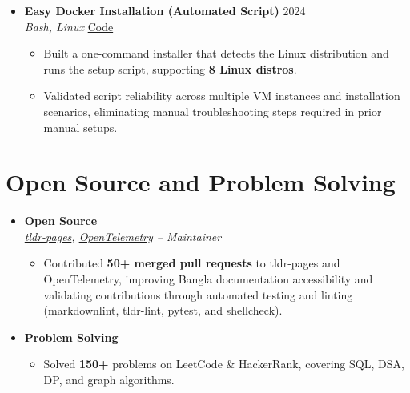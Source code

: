 \documentclass[a4paper]{article}
\newcommand{\resumeItem}[1]{
  \item\small{
    {#1 \vspace{-2pt}}
  }
}
\newcommand{\resumeItemListStart}{\begin{itemize}}
\newcommand{\resumeItemListEnd}{\end{itemize}\vspace{-5pt}}
\begin{document}
\begin{itemize}[leftmargin=0.15in, label={}, itemsep=3pt]
    \item
    \textbf{Easy Docker Installation (Automated Script)} \hfill 2024\\
    \small\textit{Bash, Linux} \hfill
    \href{https://github.com/badhon495/Easy_Docker_Installation}{Code}
    \vspace{-5pt}
    \resumeItemListStart
      \resumeItem{Built a one-command installer that detects the Linux distribution and runs the setup script, supporting \textbf{8 Linux distros}.}
      \resumeItem{Validated script reliability across multiple VM instances and installation scenarios, eliminating manual troubleshooting steps required in prior manual setups.}
    \resumeItemListEnd
    
  \end{itemize}




\section{Open Source and Problem Solving}
  \begin{itemize}[leftmargin=0.15in, label={}, itemsep=6pt]

    \item
    \textbf{Open Source} \\
    \small\textit{\href{https://github.com/tldr-pages/tldr}{tldr-pages}, \href{https://github.com/open-telemetry}{OpenTelemetry} -- Maintainer}
    \vspace{-5pt}
    \resumeItemListStart
\resumeItem{Contributed \textbf{50+ merged pull requests} to tldr-pages and OpenTelemetry, improving Bangla documentation accessibility and validating contributions through automated testing and linting (markdownlint, tldr-lint, pytest, and shellcheck).}
    \resumeItemListEnd

    \item
    \textbf{Problem Solving}
    \vspace{-5pt}
    \resumeItemListStart
\item Solved \textbf{150+} problems on LeetCode \& HackerRank, covering SQL, DSA, DP, and graph algorithms.
    \resumeItemListEnd

  \end{itemize}




\end{document}
